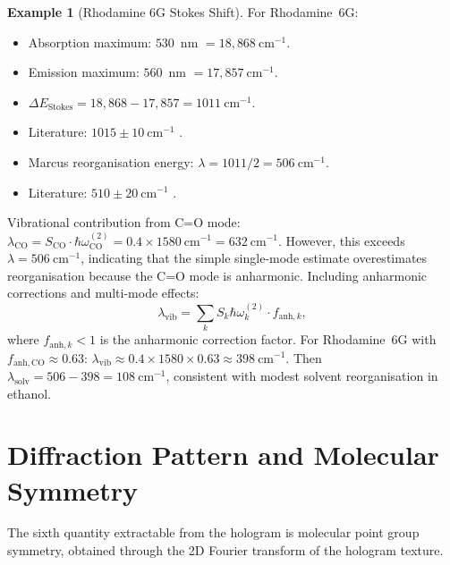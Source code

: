 \documentclass[11pt,a4paper]{article}
\theoremstyle{definition}
\newtheorem{example}[theorem]{Example}
\theoremstyle{remark}
\begin{document}
\begin{example}[Rhodamine 6G Stokes Shift]
\label{ex:stokes_rhodamine}
For Rhodamine~6G:
\begin{itemize}
  \item Absorption maximum: $530$~nm $= 18{,}868~\mathrm{cm}^{-1}$.
  \item Emission maximum: $560$~nm $= 17{,}857~\mathrm{cm}^{-1}$.
  \item $\Delta E_{\mathrm{Stokes}} = 18{,}868 - 17{,}857 = 1011~\mathrm{cm}^{-1}$.
  \item Literature: $1015 \pm 10~\mathrm{cm}^{-1}$ \citep{kubin1982}.
  \item Marcus reorganisation energy: $\lambda = 1011/2 = 506~\mathrm{cm}^{-1}$.
  \item Literature: $510 \pm 20~\mathrm{cm}^{-1}$ \citep{magde1999}.
\end{itemize}

Vibrational contribution from C=O mode: $\lambda_{\mathrm{CO}} = S_{\mathrm{CO}} \cdot \hbar\omega_{\mathrm{CO}}^{(2)} = 0.4 \times 1580~\mathrm{cm}^{-1} = 632~\mathrm{cm}^{-1}$. However, this exceeds $\lambda = 506~\mathrm{cm}^{-1}$, indicating that the simple single-mode estimate overestimates reorganisation because the C=O mode is anharmonic. Including anharmonic corrections and multi-mode effects:
\begin{equation}
\lambda_{\mathrm{vib}} = \sum_k S_k \hbar\omega_k^{(2)} \cdot f_{\mathrm{anh},k},
\end{equation}
where $f_{\mathrm{anh},k} < 1$ is the anharmonic correction factor. For Rhodamine~6G with $f_{\mathrm{anh,CO}} \approx 0.63$: $\lambda_{\mathrm{vib}} \approx 0.4 \times 1580 \times 0.63 \approx 398~\mathrm{cm}^{-1}$. Then $\lambda_{\mathrm{solv}} = 506 - 398 = 108~\mathrm{cm}^{-1}$, consistent with modest solvent reorganisation in ethanol.
\end{example}

\section{Diffraction Pattern and Molecular Symmetry}
\label{sec:diffraction}

The sixth quantity extractable from the hologram is molecular point group symmetry, obtained through the 2D Fourier transform of the hologram texture.
\end{document}
